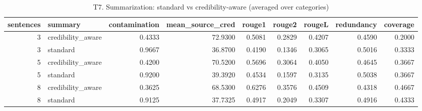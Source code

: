 \begin{table}
\caption{T7. Summarization: standard vs credibility-aware (averaged over categories)}
\begin{tabular}{rlrrrrrrr}
\toprule
sentences & summary & contamination & mean_source_cred & rouge1 & rouge2 & rougeL & redundancy & coverage \\
\midrule
3 & credibility_aware & 0.4333 & 72.9300 & 0.5081 & 0.2829 & 0.4207 & 0.4590 & 0.2000 \\
3 & standard & 0.9667 & 36.8700 & 0.4190 & 0.1346 & 0.3065 & 0.5016 & 0.3333 \\
5 & credibility_aware & 0.4200 & 70.5200 & 0.5696 & 0.3064 & 0.4050 & 0.4645 & 0.3667 \\
5 & standard & 0.9200 & 39.3920 & 0.4534 & 0.1597 & 0.3135 & 0.5038 & 0.3667 \\
8 & credibility_aware & 0.3625 & 68.5300 & 0.6276 & 0.3576 & 0.4509 & 0.4318 & 0.4667 \\
8 & standard & 0.9125 & 37.7325 & 0.4917 & 0.2049 & 0.3307 & 0.4916 & 0.4333 \\
\bottomrule
\end{tabular}
\end{table}
